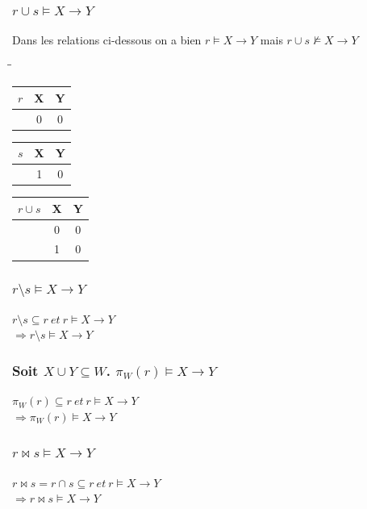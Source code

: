 \documentclass[10pt,a4paper,twoside]{article}
\begin{document}
\subsubsection{$r \cup s \models X \rightarrow Y$}
Dans les relations ci-dessous on a bien $r \models X \rightarrow Y$ mais $r \cup s \not\models X \rightarrow Y$
\begin{tabbing}
\hspace{5cm}\=\hspace{5cm}\=\kill
 \begin{tabular}{c|cc}
$r$ & X & Y \\ 
\hline 
 & 0 & 0 \\ 
\end{tabular} 
\>  \begin{tabular}{c|cc}
$s$ & X & Y \\ 
\hline 
 & 1 & 0 \\ 
\end{tabular}
 \> \begin{tabular}{c|cc}
$r\cup s$ & X & Y \\ 
\hline 
 & 0 & 0 \\
 & 1 & 0 \\ 
\end{tabular}
\end{tabbing} 

\subsubsection{$r \setminus s \models X \rightarrow Y$}
$r \setminus s \subseteq r\ et\ r \models X\rightarrow Y$\\
$\Rightarrow r \setminus s \models X \rightarrow Y$

\subsubsection{Soit $X \cup Y \subseteq W$. $\pi_{W}(r) \models X \rightarrow Y$}
$\pi_{W}(r) \subseteq r\ et\ r \models X\rightarrow Y$\\
$\Rightarrow \pi_{W}(r) \models X \rightarrow Y$

\subsubsection{$r \bowtie s \models X \rightarrow Y$}
$r \bowtie s = r \cap s \subseteq r\ et\ r \models X\rightarrow Y$\\
$\Rightarrow r \bowtie s \models X \rightarrow Y$ 
\end{document}
